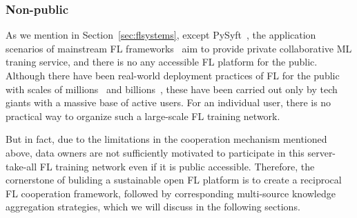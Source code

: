 \subsubsection{Non-public} %
As we mention in Section~\ref{sec:flsystems}, except PySyft~\cite{ziller2021pysyft}, the application scenarios of mainstream FL frameworks~\cite{liu2021fate, abadi2016tensorflow, zeng2023fedlab, caldas2018leaf, ibmfl2020ibm, he2020fedml, beutel2020flower, roth2022nvidia} aim to provide private collaborative ML traning service, and there is no any accessible FL platform for the public.
Although there have been real-world deployment practices of FL for the public with scales of millions~\cite{bonawitz2019towards} and billions~\cite{niu2020billion}, these have been carried out only by tech giants with a massive base of active users. For an individual user, there is no practical way to organize such a large-scale FL training network.

But in fact, due to the limitations in the cooperation mechanism mentioned above, data owners are not sufficiently motivated to participate in this server-take-all FL training network even if it is public accessible. Therefore, the cornerstone of buliding a sustainable open FL platform is to create a reciprocal FL cooperation framework, followed by corresponding multi-source knowledge aggregation strategies, which we will discuss in the following sections.